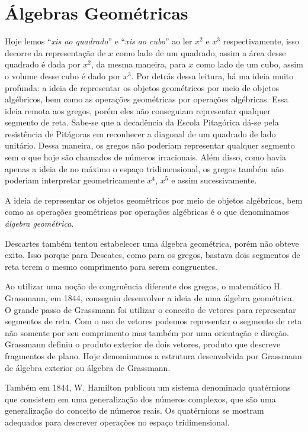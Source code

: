 \documentclass[12pt, oneside, a4paper, english, brazil]{abntex2}
\theoremstyle{normal}
\theoremstyle{observacao}
\begin{document}
\chapter{Álgebras Geométricas}\label{algebrasgeometricas}
Hoje lemos ``\emph{xis ao quadrado}'' e ``\emph{xis ao cubo}'' ao ler $x^2$ e $x^3$ respectivamente, isso decorre da representação de $x$ como lado de um quadrado, assim a área desse quadrado é dada por $x^2$, da mesma maneira, para $x$ como lado de um cubo, assim o volume desse cubo é dado por $x^3$. Por detrás dessa leitura, há ma ideia muito profunda: a ideia de representar os objetos geométricos por meio de objetos algébricos, bem como as operações geométricas por operações algébricas. Essa ideia remota aos gregos, porém eles não conseguiam representar qualquer segmento de reta. Sabe-se que a decadência da Escola Pitagórica dá-se pela resistência de Pitágoras em reconhecer a diagonal de um quadrado de lado unitário. Dessa maneira, os gregos não poderiam representar qualquer segmento sem o que hoje são chamados de números irracionais. Além disso, como havia apenas a ideia de no máximo o espaço tridimensional, os gregos também não poderiam interpretar geometricamente $x^4$, $x^5$ e assim sucessivamente. \cite{vazjrweb}

A ideia de representar os objetos geométricos por meio de objetos algébricos, bem como as operações geométricas por operações algébricas é o que denominamos \emph{álgebra geométrica}. 

Descartes também tentou estabelecer uma álgebra geométrica, porém não obteve exito. Isso porque para Descates, como para os gregos, bastava dois segmentos de reta terem o mesmo comprimento para serem congruentes. \cite{vazjrweb}

Ao utilizar uma noção de congruência diferente dos gregos, o matemático H. Grassmann, em 1844, conseguiu desenvolver a ideia de uma álgebra geométrica. O grande passo de Grassmann foi utilizar o conceito de vetores para representar segmentos de reta. Com o uso de vetores podemos representar o segmento de reta não somente por seu comprimento mas também por uma orientação e direção. Grassmann definiu o produto exterior de dois vetores, produto que descreve fragmentos de plano. Hoje denominamos a estrutura desenvolvida por Grassmann de álgebra exterior ou álgebra de Grassmann. \cite{vazjr2000}

Também em 1844, W. Hamilton publicou um sistema denominado quatérnions que consistem em uma generalização dos números complexos, que são uma generalização do conceito de números reais. Os quatérnions se mostram adequados para descrever operações no espaço tridimensional. \cite{sousa2013}
\end{document}
